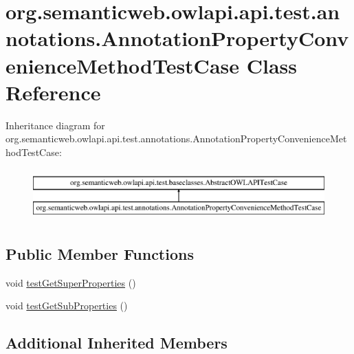 \hypertarget{classorg_1_1semanticweb_1_1owlapi_1_1api_1_1test_1_1annotations_1_1_annotation_property_convenience_method_test_case}{\section{org.\-semanticweb.\-owlapi.\-api.\-test.\-annotations.\-Annotation\-Property\-Convenience\-Method\-Test\-Case Class Reference}
\label{classorg_1_1semanticweb_1_1owlapi_1_1api_1_1test_1_1annotations_1_1_annotation_property_convenience_method_test_case}
}
Inheritance diagram for org.\-semanticweb.\-owlapi.\-api.\-test.\-annotations.\-Annotation\-Property\-Convenience\-Method\-Test\-Case\-:\begin{figure}[H]
\begin{center}
\leavevmode
\includegraphics[height=2.000000cm]{classorg_1_1semanticweb_1_1owlapi_1_1api_1_1test_1_1annotations_1_1_annotation_property_convenience_method_test_case}
\end{center}
\end{figure}
\subsection*{Public Member Functions}
\begin{DoxyCompactItemize}
\item 
void \hyperlink{classorg_1_1semanticweb_1_1owlapi_1_1api_1_1test_1_1annotations_1_1_annotation_property_convenience_method_test_case_aabdf1602c182632990f4b73ed0514536}{test\-Get\-Super\-Properties} ()
\item 
void \hyperlink{classorg_1_1semanticweb_1_1owlapi_1_1api_1_1test_1_1annotations_1_1_annotation_property_convenience_method_test_case_af2dec44ccbfcc05eec28797ffd11874f}{test\-Get\-Sub\-Properties} ()
\end{DoxyCompactItemize}
\subsection*{Additional Inherited Members}



